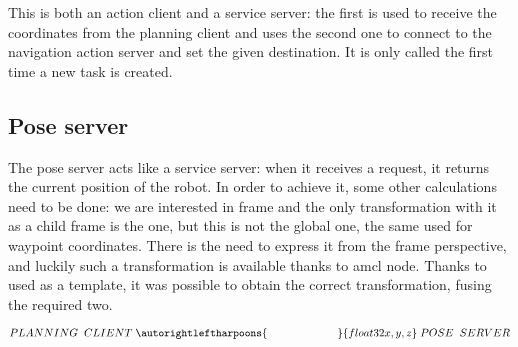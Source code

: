 This is both an action client and a service server: the first is used to receive the coordinates from the planning client and  uses the second one to connect to the navigation action server and set the given destination. It is only called the first time a new task is created.

\subsection{Pose server} %
\label{sub:pose}

The pose server acts like a service server: when it receives a request, it returns the current position of the robot. In order to achieve it, some other calculations need to be done: we are interested in  frame and the only transformation with it as a child frame is the  one, but this is not the global one, the same used for waypoint coordinates. There is the need to express it from the  frame perspective, and luckily such a transformation is available thanks to \acrshort{amcl} node. 
Thanks to \cite{tfexample} used as a template, it was possible to obtain the correct transformation, fusing the required two.

$$
    PLANNING \;\; CLIENT \; 
        \autorightleftharpoons{\;\;\;\;\;\;\;\;\;\;\;\;\;\;\;\;\;\;\;\;\;\;\;}{float32 x, y, z} \;
    POSE \;\; SERVER
$$ 





